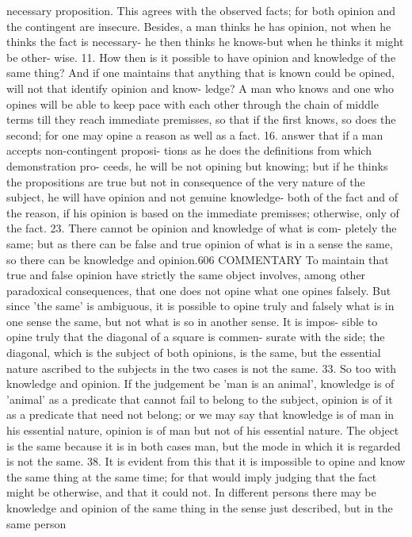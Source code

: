 {{{{{{{{{{{{{{{{{{{{{{{{{{{{{{{{{{{{{{{necessary proposition. This agrees with the observed facts; for
both opinion and the contingent are insecure. Besides, a man
thinks he has opinion, not when he thinks the fact is necessary-
he then thinks he knows-but when he thinks it might be other-
wise.
11. How then is it possible to have opinion and knowledge of
the same thing? And if one maintains that anything that is
known could be opined, will not that identify opinion and know-
ledge? A man who knows and one who opines will be able to
keep pace with each other through the chain of middle terms till
they reach immediate premisses, so that if the first knows, so
does the second; for one may opine a reason as well as a fact.
16. \Ve answer that if a man accepts non-contingent proposi-
tions as he does the definitions from which demonstration pro-
ceeds, he will be not opining but knowing; but if he thinks the
propositions are true but not in consequence of the very nature
of the subject, he will have opinion and not genuine knowledge-
both of the fact and of the reason, if his opinion is based on the
immediate premisses; otherwise, only of the fact.
23. There cannot be opinion and knowledge of what is com-
pletely the same; but as there can be false and true opinion of
what is in a sense the same, so there can be knowledge and opinion.606
COMMENTARY
To maintain that true and false opinion have strictly the same
object involves, among other paradoxical consequences, that one
does not opine what one opines falsely. But since 'the same' is
ambiguous, it is possible to opine truly and falsely what is in one
sense the same, but not what is so in another sense. It is impos-
sible to opine truly that the diagonal of a square is commen-
surate with the side; the diagonal, which is the subject of both
opinions, is the same, but the essential nature ascribed to the
subjects in the two cases is not the same.
33. So too with knowledge and opinion. If the judgement be
'man is an animal', knowledge is of 'animal' as a predicate that
cannot fail to belong to the subject, opinion is of it as a predicate
that need not belong; or we may say that knowledge is of man
in his essential nature, opinion is of man but not of his essential
nature. The object is the same because it is in both cases man,
but the mode in which it is regarded is not the same.
38. It is evident from this that it is impossible to opine and
know the same thing at the same time; for that would imply
judging that the fact might be otherwise, and that it could not.
In different persons there may be knowledge and opinion of the
same thing in the sense just described, but in the same person
}}}}}}}}}}}}}}}}}}}}}}}}}}}}}}}}}}}}}}}
